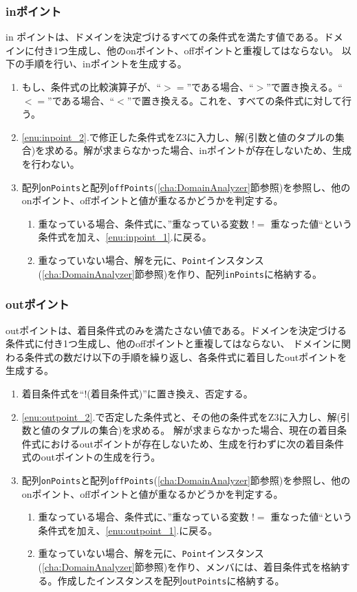 \documentclass[uplatex, report, a4j, 10pt]{jsbook}
\newcommand\ttt[1]{\texttt{#1}}
\begin{document}
\subsubsection{inポイント}
in ポイントは、ドメインを決定づけるすべての条件式を満たす値である。ドメインに付き1つ生成し、他のonポイント、offポイントと重複してはならない。
以下の手順を行い、inポイントを生成する。
\begin{enumerate}
  \item\label{enu:inpoint_2} もし、条件式の比較演算子が、“$>=$”である場合、“$>$”で置き換える。“$<=$”である場合、“$<$”で置き換える。これを、すべての条件式に対して行う。
  \item\label{enu:inpoint_1} \ref{enu:inpoint_2}.で修正した条件式をZ3に入力し、解(引数と値のタプルの集合)を求める。解が求まらなかった場合、inポイントが存在しないため、生成を行わない。
  \item 配列\ttt{onPoints}と配列\ttt{offPoints}(\ref{cha:DomainAnalyzer}節参照)を参照し、他のonポイント、offポイントと値が重なるかどうかを判定する。
        \begin{enumerate}
          \item 重なっている場合、条件式に、”重なっている変数 $!=$ 重なった値“という条件式を加え、\ref{enu:inpoint_1}.に戻る。
          \item 重なっていない場合、解を元に、\ttt{Point}インスタンス(\ref{cha:DomainAnalyzer}節参照)を作り、配列\ttt{inPoints}に格納する。
        \end{enumerate}
\end{enumerate}

\subsubsection{outポイント}
outポイントは、着目条件式のみを満たさない値である。ドメインを決定づける条件式に付き1つ生成し、他のoffポイントと重複してはならない、
ドメインに関わる条件式の数だけ以下の手順を繰り返し、各条件式に着目したoutポイントを生成する。
\begin{enumerate}
  \item\label{enu:outpoint_2} 着目条件式を“$!$(着目条件式)”に置き換え、否定する。
  \item\label{enu:outpoint_1} \ref{enu:outpoint_2}.で否定した条件式と、その他の条件式をZ3に入力し、解(引数と値のタプルの集合)を求める。
        解が求まらなかった場合、現在の着目条件式におけるoutポイントが存在しないため、生成を行わずに次の着目条件式のoutポイントの生成を行う。
  \item 配列\ttt{onPoints}と配列\ttt{offPoints}(\ref{cha:DomainAnalyzer}節参照)を参照し、他のonポイント、offポイントと値が重なるかどうかを判定する。
        \begin{enumerate}
          \item 重なっている場合、条件式に、”重なっている変数 $!=$ 重なった値“という条件式を加え、\ref{enu:outpoint_1}.に戻る。
          \item 重なっていない場合、解を元に、\ttt{Point}インスタンス(\ref{cha:DomainAnalyzer}節参照)を作り、メンバ\forcusedConditionalExpression{}には、着目条件式を格納する。作成したインスタンスを配列\ttt{outPoints}に格納する。
        \end{enumerate}
\end{enumerate}
\end{document}
